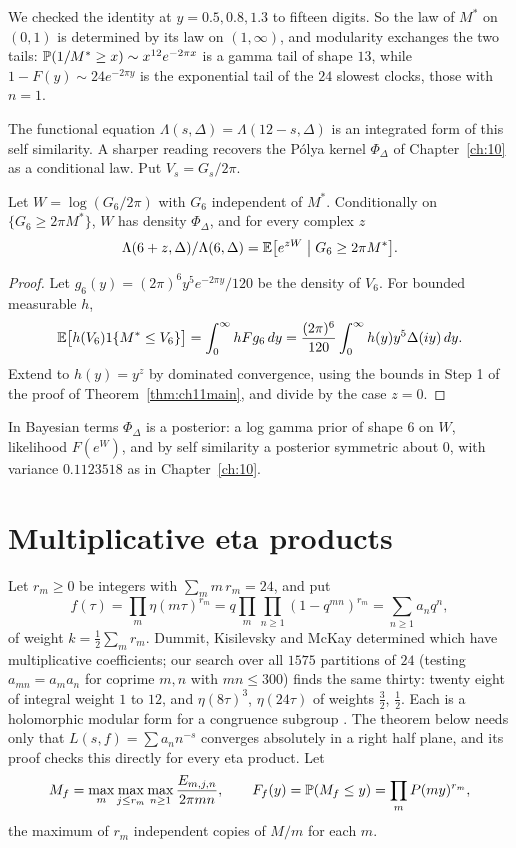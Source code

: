 We checked the identity at $y=0.5,0.8,1.3$ to fifteen digits. So the law of $M^*$ on $(0,1)$ is determined by its law on $(1,\infty)$, and modularity exchanges the two tails: $\mathbb{P}(1/M^*\ge x)\sim x^{12}e^{-2\pi x}$ is a gamma tail of shape $13$, while $1-F(y)\sim24e^{-2\pi y}$ is the exponential tail of the $24$ slowest clocks, those with $n=1$.

The functional equation $\Lambda(s,\Delta)=\Lambda(12-s,\Delta)$ is an integrated form of this self similarity. A sharper reading recovers the P\'olya kernel $\Phi_\Delta$ of Chapter~\ref{ch:10} as a conditional law. Put $V_s=G_s/2\pi$.

\begin{proposition}\label{prop:ch11posterior}
Let $W=\log(G_6/2\pi)$ with $G_6$ independent of $M^*$. Conditionally on $\{G_6\ge2\pi M^*\}$, $W$ has density $\Phi_\Delta$, and for every complex $z$
\[
\Lambda(6+z,\Delta)/\Lambda(6,\Delta)=\mathbb{E}\bigl[e^{zW}\bigm| G_6\ge2\pi M^*\bigr].
\]
\end{proposition}

\begin{proof}
Let $g_6(y)=(2\pi)^6y^5e^{-2\pi y}/120$ be the density of $V_6$. For bounded measurable $h$,
\[
\mathbb{E}\bigl[h(V_6)1\{M^*\le V_6\}\bigr]=\int_0^\infty hFg_6\,dy=\frac{(2\pi)^6}{120}\int_0^\infty h(y)y^5\Delta(iy)\,dy .
\]
Extend to $h(y)=y^z$ by dominated convergence, using the bounds in Step 1 of the proof of Theorem~\ref{thm:ch11main}, and divide by the case $z=0$.
\end{proof}

In Bayesian terms $\Phi_\Delta$ is a posterior: a log gamma prior of shape $6$ on $W$, likelihood $F(e^W)$, and by self similarity a posterior symmetric about $0$, with variance $0.1123518$ as in Chapter~\ref{ch:10}.

\section{Multiplicative eta products}

Let $r_m\ge0$ be integers with $\sum_mm\,r_m=24$, and put
\[
f(\tau)=\prod_m\eta(m\tau)^{r_m}=q\prod_m\prod_{n\ge1}(1-q^{mn})^{r_m}=\sum_{n\ge1}a_nq^n,
\]
of weight $k=\frac12\sum_mr_m$. Dummit, Kisilevsky and McKay \cite{dkm1985} determined which have multiplicative coefficients; our search over all $1575$ partitions of $24$ (testing $a_{mn}=a_ma_n$ for coprime $m,n$ with $mn\le300$) finds the same thirty: twenty eight of integral weight $1$ to $12$, and $\eta(8\tau)^3$, $\eta(24\tau)$ of weights $\frac32$, $\frac12$. Each is a holomorphic modular form for a congruence subgroup \cite{koehler2011}. The theorem below needs only that $L(s,f)=\sum a_nn^{-s}$ converges absolutely in a right half plane, and its proof checks this directly for every eta product. Let
\[
M_f=\max_m\max_{j\le r_m}\max_{n\ge1}\frac{E_{m,j,n}}{2\pi mn},\qquad F_f(y)=\mathbb{P}(M_f\le y)=\prod_mP(my)^{r_m},
\]
the maximum of $r_m$ independent copies of $M/m$ for each $m$.

